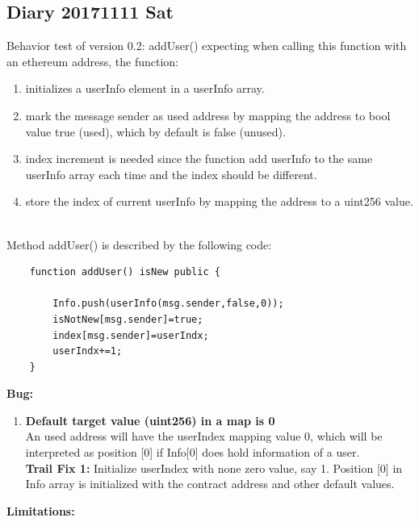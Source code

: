 \subsection{Diary 20171111 Sat}
Behavior test of version 0.2: addUser()
expecting when calling this function with an ethereum address, 
the function:
\begin{enumerate}
    \item initializes a userInfo element in a userInfo array.
    \item mark the message sender as used address by mapping the address
    to bool value true (used), which by default is false (unused).
    \item index increment is needed since the function add userInfo
    to the same userInfo array each time and the index should be different.
    \item store the index of current userInfo by mapping the address to 
    a uint256 value.\\\\
\end{enumerate}
Method addUser() is described by the following code:
\begin{lstlisting}
    function addUser() isNew public {
        
        Info.push(userInfo(msg.sender,false,0));
        isNotNew[msg.sender]=true;
        index[msg.sender]=userIndx;
        userIndx+=1;
    }
\end{lstlisting}
\noindent
\textbf{Bug:}
\begin{enumerate}
    \item \textbf{Default target value (uint256) in a map is 0}\\
    An used address will have the userIndex mapping value 0, which 
    will be interpreted as position [0] if Info[0] does hold information
    of a user.\\
    \textbf{Trail Fix 1:} Initialize userIndex with none zero value, say 1.
    Position [0] in Info array is initialized with the contract address
    and other default values.\\
\end{enumerate}
\textbf{Limitations:}
